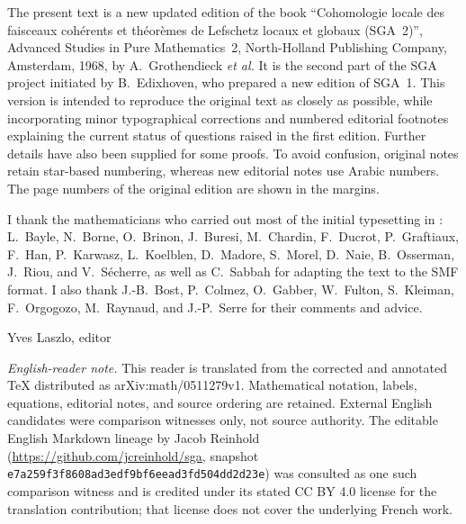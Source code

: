 \documentclass[11pt,a4paper,oneside]{book}
\begin{document}
The present text is a new updated edition of the book
``Cohomologie locale des faisceaux coh\'erents et th\'eor\`emes de Lefschetz
locaux et globaux (SGA~2)'', Advanced Studies in Pure Mathematics~2,
North-Holland Publishing Company, Amsterdam, 1968, by A.~Grothendieck
\emph{et al.} It is the second part of the SGA project initiated by
B.~Edixhoven, who prepared a new edition of SGA~1. This version is intended
to reproduce the original text as closely as possible, while incorporating
minor typographical corrections and numbered editorial footnotes explaining
the current status of questions raised in the first edition. Further details
have also been supplied for some proofs. To avoid confusion, original notes
retain star-based numbering, whereas new editorial notes use Arabic numbers.
The page numbers of the original edition are shown in the margins.

I thank the mathematicians who carried out most of the initial typesetting
in \LaTeXe: L.~Bayle, N.~Borne, O.~Brinon, J.~Buresi, M.~Chardin,
F.~Ducrot, P.~Graftiaux, F.~Han, P.~Karwasz, L.~Koelblen, D.~Madore,
S.~Morel, D.~Naie, B.~Osserman, J.~Riou, and V.~S\'echerre, as well as
C.~Sabbah for adapting the text to the SMF format. I also thank J.-B.~Bost,
P.~Colmez, O.~Gabber, W.~Fulton, S.~Kleiman, F.~Orgogozo, M.~Raynaud, and
J.-P.~Serre for their comments and advice.

\begin{flushright}
Yves Laszlo, editor
\end{flushright}

\medskip
\noindent\textit{English-reader note.} This reader is translated from the
corrected and annotated TeX distributed as arXiv:math/0511279v1. Mathematical
notation, labels, equations, editorial notes, and source ordering are retained.
External English candidates were comparison witnesses only, not source
authority. The editable English Markdown lineage by Jacob Reinhold
(\url{https://github.com/jcreinhold/sga}, snapshot
\texttt{e7a259f3f8608ad3edf9bf6eead3fd504dd2d23e}) was consulted as one such
comparison witness and is credited under its stated CC BY 4.0 license for
the translation contribution; that license does not cover the underlying
French work.

\cleardoublepage
\tableofcontents

\mainmatter















\end{document}
